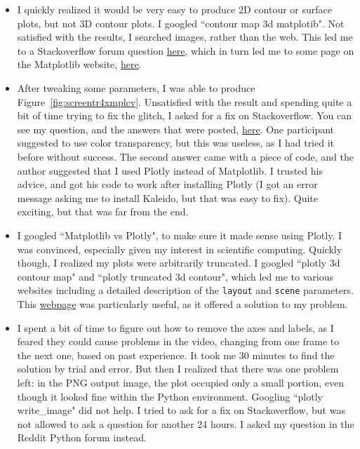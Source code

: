 \documentclass[oneside,10pt]{book}
\begin{document}
\begin{itemize}
\item I quickly realized it would be very easy to produce 2D contour or surface plots, but not 3D contour plots. I googled ``contour map 3d matplotib". Not satisfied with the results, I searched images, rather than the web. This led me to a Stackoverflow forum question \href{https://stackoverflow.com/questions/35445424/surface-and-3d-contour-in-matplotlib}{here}, which in turn led me to some page on the Matplotlib website, \href{https://matplotlib.org/stable/api/_as_gen/matplotlib.pyplot.contour.html}{here}.

\item After tweaking some parameters, I was able to produce Figure~\ref{fig:screentr4xmplcv}. Unsatisfied with the result and spending quite a bit of time trying to fix the glitch, I asked for a fix on Stackoverflow. You can see my question, and the answers that were posted, \href{https://stackoverflow.com/questions/74166875/problem-with-3d-contour-plots-in-matplotlib}{here}. One participant suggested to use color transparency, but this was useless, as I had tried it before without success. The second answer came with a piece of code, and the author suggested that I used Plotly instead of Matplotlib. I trusted his advice, and got his code to work after installing Plotly (I got an error message asking me to install Kaleido, but that was easy to fix). Quite exciting, but that was far from the end.

\item I googled ``Matplotlib vs Plotly", to make sure it made sense using Plotly. I was convinced, especially given my interest in scientific computing. Quickly though, I realized my plots were arbitrarily truncated. I googled ``plotly 3d contour map" and ``plotly truncated 3d contour", which led me to various websites including a detailed description of the \texttt{layout} and \texttt{scene} parameters. This \href{https://stackoverflow.com/questions/73187799/truncated-figure-with-plotly}{webpage} was particularly useful, as it offered a solution to my problem.

\item I spent a bit of time to figure out how to remove the axes and labels, as I feared they could cause problems in the video, changing from one frame to the next one, based on past experience. It took me 30 minutes to find the solution by trial and error. But then I realized that there was one problem left: in the PNG output image, the plot occupied only a small portion, even though it looked fine within the Python environment. Googling ``plotly write\_image" did not help. I tried to ask for a fix on Stackoverflow, but was not allowed to ask a question for another 24 hours. I asked my question in the Reddit Python forum instead.


\end{itemize}
\end{document}
